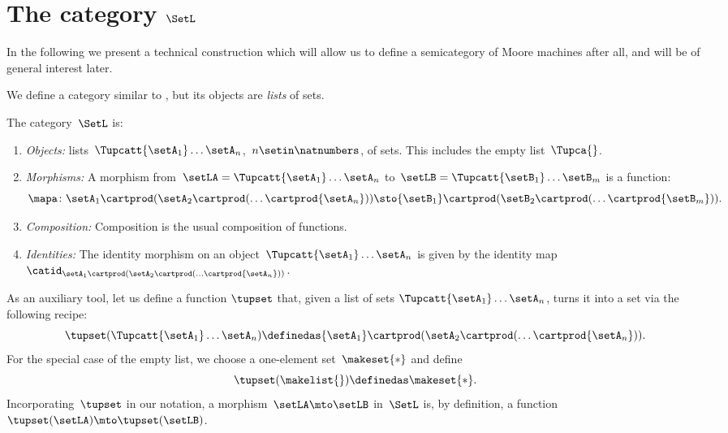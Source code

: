 
\section{The category $\SetL$}
\label{sec:SetL}

In the following we present a technical construction which will allow us to define a semicategory of Moore machines after all, and will be of general interest later.

We define a category similar to \Set, but its objects are \emph{lists} of sets.

\begin{definition}
    \label{def:SetL}
    The category~$\SetL$ is:
    \begin{enumerate}
        \item \emph{Objects:} lists~$\Tupcatt {\setA_1}  \dots {\setA_n}$,~$n \setin \natnumbers$, of sets.
              This includes the empty list~$\Tupca {}$.
        \item \emph{Morphisms:}
              A morphism from~$\setLA =\Tupcatt {\setA_1}  \dots {\setA_n}$ to~$\setLB = \Tupcatt {\setB_1} \dots {\setB_m}$ is a function:
              \begin{equation*}
                  \mapa\colon {\setA_1} \cartprod (\setA_2 \cartprod (\ldots \cartprod {\setA_n})) \sto {\setB_1} \cartprod (\setB_2 \cartprod (\ldots \cartprod {\setB_m})).
              \end{equation*}
        \item \emph{Composition:}
              Composition is the usual composition of functions.
        \item \emph{Identities:}
              The identity morphism on an object~$\Tupcatt {\setA_1} \dots {\setA_n}$ is given by the identity map~$\catid_{{\setA_1} \cartprod (\setA_2 \cartprod (\ldots \cartprod {\setA_n}))}$.
    \end{enumerate}
\end{definition}

As an auxiliary tool, let us define a function $\tupset$ that, given a list of sets $\Tupcatt {\setA_1}  \dots {\setA_n}$, turns it into a set via the following recipe:
\begin{equation*}
    \tupset (\Tupcatt {\setA_1}  \dots {\setA_n}) \definedas {\setA_1} \cartprod (\setA_2 \cartprod (\ldots \cartprod {\setA_n})).
\end{equation*}
For the special case of the empty list, we choose a one-element set~$\makeset{*}$ and define
\begin{equation*}
    \tupset (\makelist{}) \definedas \makeset{*}.
\end{equation*}
Incorporating~$\tupset$ in our notation, a morphism~$\setLA \mto \setLB$ in~$\SetL$ is, by definition, a function~$\tupset(\setLA) \mto \tupset(\setLB)$.

